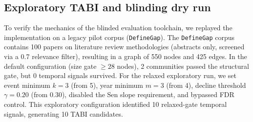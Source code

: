 \documentclass[runningheads]{llncs}
\begin{document}
\subsection{Exploratory TABI and blinding dry run}
To verify the mechanics of the blinded evaluation toolchain, we replayed the implementation on a legacy pilot corpus (\texttt{DefineGap}). The \texttt{DefineGap} corpus contains 100 papers on literature review methodologies (abstracts only, screened via a 0.7 relevance filter), resulting in a graph of 550 nodes and 425 edges. In the default configuration (size gate $\ge 28$ nodes), 2 communities passed the structural gate, but 0 temporal signals survived. For the relaxed exploratory run, we set event minimum $k=3$ (from 5), year minimum $m=3$ (from 4), decline threshold $\gamma=0.20$ (from 0.30), disabled the Sen slope requirement, and bypassed FDR control. This exploratory configuration identified 10 relaxed-gate temporal signals, generating 10 TABI candidates.
\end{document}
